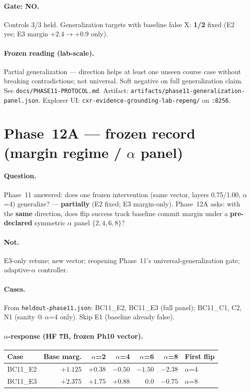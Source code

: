 \documentclass[11pt,a4paper]{article}
\begin{document}
\paragraph{Gate: NO.}
Controls 3/3 held. Generalization targets with baseline false X: \textbf{1/2} fixed (E2 yes; E3 margin +2.4$\rightarrow$+0.9 only).

\paragraph{Frozen reading (lab-scale).}
Partial generalization --- direction helps at least one unseen course case without breaking contradictions; not universal. Soft negative on full generalization claim.
See \texttt{docs/PHASE11-PROTOCOL.md}. Artifact: \texttt{artifacts/phase11-generalization-panel.json}.
Explorer UI: \texttt{cxr-evidence-grounding-lab-repeng/} on \texttt{:8256}.

\section{Phase~12A --- frozen record (margin regime / $\alpha$ panel)}

\paragraph{Question.}
Phase~11 answered: does one frozen intervention (same vector, layers 0.75/1.00, $\alpha$=4) generalize? --- \textbf{partially} (E2 fixed; E3 margin-only).
Phase~12A asks: with the \textbf{same} direction, does flip success track baseline commit margin under a \textbf{pre-declared} symmetric $\alpha$ panel $\{2,4,6,8\}$?

\paragraph{Not.}
E3-only retune; new vector; reopening Phase~11's universal-generalization gate; adaptive-$\alpha$ controller.

\paragraph{Cases.}
From \texttt{heldout-phase11.json}: BC11\_E2, BC11\_E3 (full panel); BC11\_C1, C2, N1 (sanity @ $\alpha$=4 only). Skip E1 (baseline already false).

\paragraph{$\alpha$-response (HF 7B, frozen Ph10 vector).}
\begin{center}
\small
\begin{tabular}{lrrrrrl}
\toprule
Case & Base marg. & $\alpha$=2 & $\alpha$=4 & $\alpha$=6 & $\alpha$=8 & First flip \\
\midrule
BC11\_E2 & $+1.125$ & $+0.38$ & $\mathbf{-0.50}$ & $-1.50$ & $-2.38$ & $\alpha$=4 \\
BC11\_E3 & $+2.375$ & $+1.75$ & $+0.88$ & $0.0$ & $\mathbf{-0.75}$ & $\alpha$=8 \\
\bottomrule
\end{tabular}
\end{center}
\end{document}
